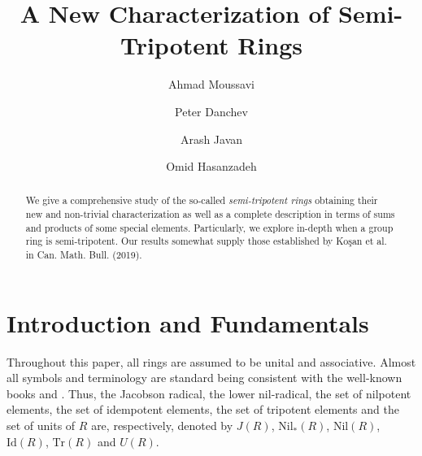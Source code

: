 \documentclass[12pt]{amsart}
\theoremstyle{definition}
\begin{document}
\author[A. Moussavi]{Ahmad Moussavi}
\address{Department of Mathematics, Tarbiat Modares University, 14115-111 Tehran Jalal AleAhmad Nasr, Iran}

\author[P. Danchev]{Peter Danchev}
\address{Institute of Mathematics and Informatics, Bulgarian Academy of Sciences, 1113 Sofia, Bulgaria}

\author[A. Javan]{Arash Javan}
\address{Department of Mathematics, Tarbiat Modares University, 14115-111 Tehran Jalal AleAhmad Nasr, Iran}

\author[O. Hasanzadeh]{Omid Hasanzadeh}
\address{Department of Mathematics, Tarbiat Modares University, 14115-111 Tehran Jalal AleAhmad Nasr, Iran}

\title{A New Characterization of Semi-Tripotent Rings}

\maketitle




\begin{abstract} We give a comprehensive study of the so-called {\it semi-tripotent rings} obtaining their new and non-trivial characterization as well as a complete description in terms of sums and products of some special elements. Particularly, we explore in-depth when a group ring is semi-tripotent. Our results somewhat supply those established by Ko\c{s}an et al. in Can. Math. Bull. (2019).
\end{abstract}


\section{Introduction and Fundamentals}

Throughout this paper, all rings are assumed to be unital and associative. Almost all symbols and terminology are standard being consistent with the well-known books \cite{lamf} and \cite{lame}. Thus, the Jacobson radical, the lower nil-radical, the set of nilpotent elements, the set of idempotent elements, the set of tripotent elements and the set of units of \( R \) are, respectively, denoted by \( J(R) \), \( \text{Nil}_{*}(R) \), \( \text{Nil}(R) \), \( \text{Id}(R) \), \( \text{Tr}(R) \) and \( U(R) \).
\end{document}

